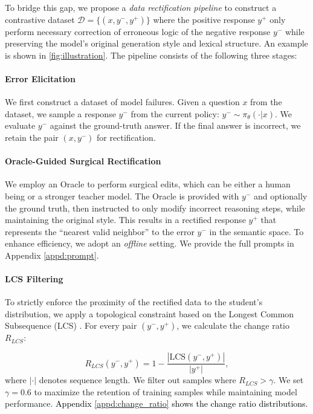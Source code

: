 \documentclass{article}
\newcommand{\modify}[1]{\textcolor{black}{#1}} %
\theoremstyle{plain}
\theoremstyle{definition}
\theoremstyle{remark}
\begin{document}
To bridge this gap, we propose a \textit{data rectification pipeline} to construct a contrastive dataset $\mathcal{D} = \{(x, y^-, y^+)\}$ where the positive response $y^+$ only perform necessary correction of erroneous logic of the negative response $y^-$ while preserving the model's original generation style and lexical structure. An example is shown in \cref{fig:illustration}. The pipeline consists of the following three stages:

\paragraph{Error Elicitation}
We first construct a dataset of model failures. Given a question $x$ from the dataset, we sample a response $y^-$ from the current policy: $y^- \sim \pi_\theta(\cdot|x)$. We evaluate $y^-$ against the ground-truth answer. If the final answer is incorrect, we retain the pair $(x, y^-)$ for rectification.

\paragraph{Oracle-Guided Surgical Rectification}
We employ an Oracle to perform surgical edits, which can be either a human being or a stronger teacher model. The Oracle is provided with $y^-$ and optionally the ground truth, then instructed to only modify incorrect reasoning steps, while maintaining the original style. This results in a rectified response $y^+$ that represents the ``nearest valid neighbor'' to the error $y^-$ in the semantic space. To enhance efficiency, we adopt an \textit{offline} setting. We provide the full prompts in Appendix \ref{appd:prompt}.



\paragraph{LCS Filtering}
\label{sec:data}
To strictly enforce the proximity of the rectified data to the student's distribution, we apply a topological constraint based on the Longest Common Subsequence (LCS) \cite{wagner1974string}. For every pair $(y^-, y^+)$, we calculate the change ratio $R_{LCS}$:

\begin{equation}
    R_{LCS}(y^-, y^+) = 1-\frac{|\text{LCS}(y^-, y^+)|}{|y^+|},
    \label{eq:change_ratio}
\end{equation}
where $|\cdot|$ denotes sequence length. We filter out samples where $R_{LCS} > \gamma$. We set $\gamma=0.6$ to maximize the retention of training samples while maintaining model performance. \modify{Appendix \ref{appd:change_ratio} shows the change ratio distributions.}
\end{document}
